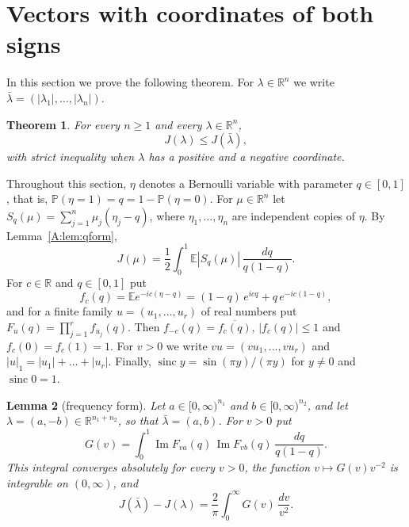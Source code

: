 \documentclass[11pt]{amsart}
\newtheorem{theorem}{Theorem}[section]
\newtheorem{lemma}[theorem]{Lemma}
\theoremstyle{remark}
\numberwithin{equation}{section}
\newcommand{\R}{\mathbb{R}}
\newcommand{\E}{\mathbb{E}}
\renewcommand{\P}{\mathbb{P}}
\begin{document}
\section{Vectors with coordinates of both signs}\label{sec:thmB}

In this section we prove the following theorem. For $\lambda\in\R^n$ we write $\bar\lambda=(|\lambda_1|,\dots,|\lambda_n|)$.

\begin{theorem}\label{B:thm:B}
For every $n\ge1$ and every $\lambda\in\R^n$,
\[
J(\lambda)\le J(\bar\lambda),
\]
with strict inequality when $\lambda$ has a positive and a negative coordinate.
\end{theorem}

Throughout this section, $\eta$ denotes a Bernoulli variable with parameter $q\in[0,1]$, that is, $\P(\eta=1)=q=1-\P(\eta=0)$. For $\mu\in\R^n$ let $S_q(\mu)=\sum_{j=1}^n\mu_j(\eta_j-q)$, where $\eta_1,\dots,\eta_n$ are independent copies of $\eta$. By Lemma~\ref{A:lem:qform},
\begin{equation}\label{B:eq:qform}
J(\mu)=\frac12\int_0^1\E|S_q(\mu)|\,\frac{dq}{q(1-q)}.
\end{equation}
For $c\in\R$ and $q\in[0,1]$ put
\begin{equation}\label{B:eq:fc}
f_c(q)=\E e^{-ic(\eta-q)}=(1-q)\,e^{icq}+q\,e^{-ic(1-q)},
\end{equation}
and for a finite family $u=(u_1,\dots,u_r)$ of real numbers put $F_u(q)=\prod_{j=1}^rf_{u_j}(q)$. Then $f_{-c}(q)=\overline{f_c(q)}$, $|f_c(q)|\le1$ and $f_c(0)=f_c(1)=1$. For $v>0$ we write $vu=(vu_1,\dots,vu_r)$ and $|u|_1=|u_1|+\dots+|u_r|$. Finally, $\operatorname{sinc}y=\sin(\pi y)/(\pi y)$ for $y\ne0$ and $\operatorname{sinc}0=1$.

\begin{lemma}[frequency form]\label{B:lem:freq}
Let $a\in[0,\infty)^{n_1}$ and $b\in[0,\infty)^{n_2}$, and let $\lambda=(a,-b)\in\R^{n_1+n_2}$, so that $\bar\lambda=(a,b)$. For $v>0$ put
\[
G(v)=\int_0^1\operatorname{Im}F_{va}(q)\,\operatorname{Im}F_{vb}(q)\,\frac{dq}{q(1-q)}.
\]
This integral converges absolutely for every $v>0$, the function $v\mapsto G(v)v^{-2}$ is integrable on $(0,\infty)$, and
\[
J(\bar\lambda)-J(\lambda)=\frac2\pi\int_0^\infty G(v)\,\frac{dv}{v^2}.
\]
\end{lemma}
\end{document}
